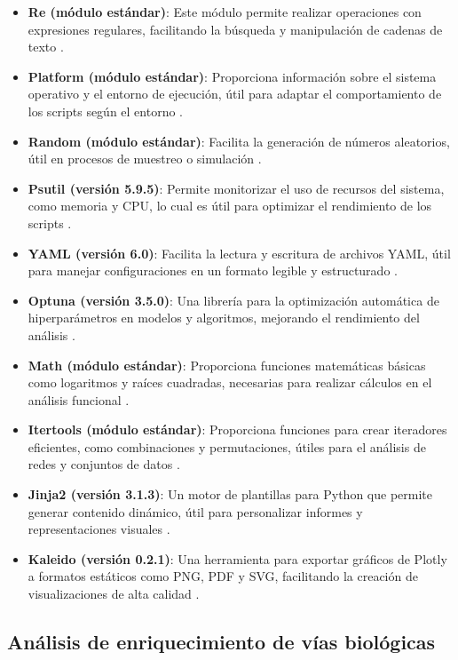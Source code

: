 \begin{itemize}
	\item \textbf{Re (módulo estándar)}: Este módulo permite realizar operaciones con expresiones regulares, facilitando la búsqueda y manipulación de cadenas de texto \cite{re}.
	\item \textbf{Platform (módulo estándar)}: Proporciona información sobre el sistema operativo y el entorno de ejecución, útil para adaptar el comportamiento de los scripts según el entorno \cite{platform}.
	\item \textbf{Random (módulo estándar)}: Facilita la generación de números aleatorios, útil en procesos de muestreo o simulación \cite{random}.
	\item \textbf{Psutil (versión 5.9.5)}: Permite monitorizar el uso de recursos del sistema, como memoria y CPU, lo cual es útil para optimizar el rendimiento de los scripts \cite{psutil}.
	\item \textbf{YAML (versión 6.0)}: Facilita la lectura y escritura de archivos YAML, útil para manejar configuraciones en un formato legible y estructurado \cite{pyyaml}.
	\item \textbf{Optuna (versión 3.5.0)}: Una librería para la optimización automática de hiperparámetros en modelos y algoritmos, mejorando el rendimiento del análisis \cite{optuna}.
	\item \textbf{Math (módulo estándar)}: Proporciona funciones matemáticas básicas como logaritmos y raíces cuadradas, necesarias para realizar cálculos en el análisis funcional \cite{math}.
	\item \textbf{Itertools (módulo estándar)}: Proporciona funciones para crear iteradores eficientes, como combinaciones y permutaciones, útiles para el análisis de redes y conjuntos de datos \cite{itertools}.
	\item \textbf{Jinja2 (versión 3.1.3)}: Un motor de plantillas para Python que permite generar contenido dinámico, útil para personalizar informes y representaciones visuales \cite{jinja2}.
	\item \textbf{Kaleido (versión 0.2.1)}: Una herramienta para exportar gráficos de Plotly a formatos estáticos como PNG, PDF y SVG, facilitando la creación de visualizaciones de alta calidad \cite{kaleido}.
	

\end{itemize}


\subsection{Análisis de enriquecimiento de vías biológicas}

